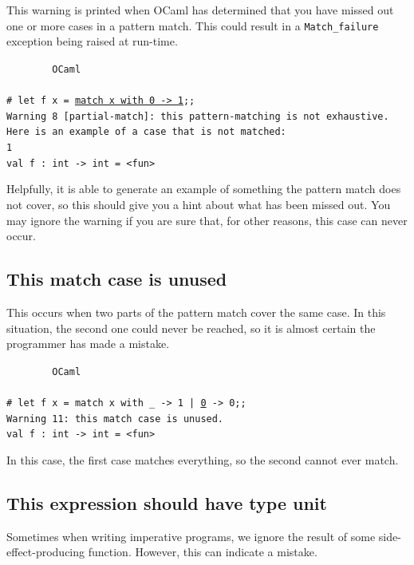 \documentclass[]{book}
\newcommand{\smspace}{\vspace{4mm}}
\begin{document}
This warning is printed when OCaml has determined that you have missed out one or more cases in a pattern match. This could result in a \texttt{Match\_failure} exception being raised at run-time.

\smspace
\noindent\verb!        OCaml!\\
\noindent\\
\texttt{\# let f x = }\underline{\verb!match x with 0 -> 1!}\texttt{;;}\\
\texttt{Warning 8 [partial-match]:\ this pattern-matching is not exhaustive.}\\
\texttt{Here is an example of a case that is not matched:}\\
\texttt{1}\\
\texttt{val f :\ int -> int = <fun>}
\smspace

\noindent Helpfully, it is able to generate an example of something the pattern match does not cover, so this should give you a hint about what has been missed out. You may ignore the warning if you are sure that, for other reasons, this case can never occur.

\subsection*{This match case is unused}

This occurs when two parts of the pattern match cover the same case. In this situation, the second one could never be reached, so it is almost certain the programmer has made a mistake.

\smspace
\noindent\verb!        OCaml!\\
\noindent\\
\texttt{\# let f x = match x with \_ -> 1 | }\underline{\verb!0!}\texttt{ -> 0;;}\\
\texttt{Warning 11:\ this match case is unused.}\\
\texttt{val f :\ int -> int = <fun>}
\smspace

\noindent In this case, the first case matches everything, so the second cannot ever match.

\subsection*{This expression should have type unit}

Sometimes when writing imperative programs, we ignore the result of some side-effect-producing function. However, this can indicate a mistake.
\end{document}
